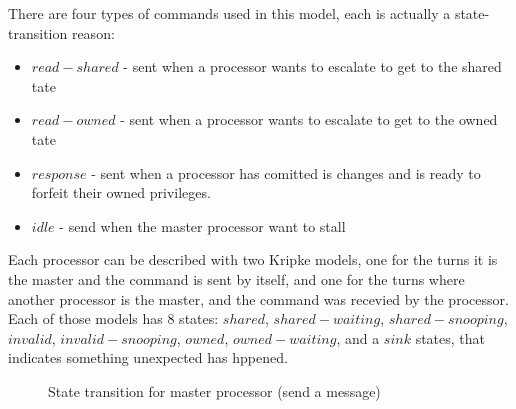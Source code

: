 \documentclass[11pt]{article}
\begin{document}
        There are four types of commands used in this model, each is actually a state-transition reason:
        \begin{itemize}
            \item
                $read-shared$ - sent when a processor wants to escalate to get to the shared tate
            \item
                $read-owned$ - sent when a processor wants to escalate to get to the owned tate
            \item
                $response$ - sent when a processor has comitted is changes and is ready to forfeit
                their owned privileges.
            \item 
                $idle$ - send when the master processor want to stall
        \end{itemize}

        Each processor can be described with two Kripke models, one for the turns it 
        is the master and the command is sent by itself, and one for the turns where another 
        processor is the master, and the command was recevied by the processor.
        Each of those models has 8 states: $shared$, $shared-waiting$, $shared-snooping$,
        $invalid$, $invalid-snooping$, $owned$, $owned-waiting$, and a $sink$ states, that indicates something 
        unexpected has hppened. 

        \begin{figure}
        \caption{State transition for master processor (send a message)} \label{fig:ProcModelMaster}
        \end{figure}
\end{document}
